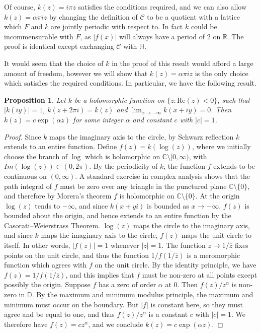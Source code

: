 \documentclass[a4paper, oneside, 12pt]{amsart}
\newtheorem{proposition}{Proposition}
\renewcommand{\Re}{\text{Re}}
\newcommand{\mc}{\mathcal}
\newcommand{\C}{\mathbb{C}}
\newcommand{\D}{\mathbb{D}}
\renewcommand{\H}{\mathbb{H}}
\newcommand{\R}{\mathbb{R}}
\begin{document}
Of course, $k(z) = i\pi z$ satisfies the conditions required, and we can also allow $k(z) = \alpha \pi i z$ by changing the definition
of $\mc{C}$ to be a quotient with a lattice which $F$ and $k$ are jointly periodic with respect to. In fact $k$ could be incommensurable
with $F$, as $|f(x)|$ will always have a period of $2$ on $\R$. The proof is identical except exchanging $\mc{C}$ with $\H$. 

It would seem that the choice of $k$ in the proof of this result would afford a
large amount of freedom, however we will show that $k(z) = \alpha \pi i z$ is
the only choice which satisfies the required conditions. In particular, we have
the following result.
\begin{proposition}
	Let $k$ be a holomorphic function on $\{z:\Re(z)<0\}$, such that $|k(iy)|=1$, $k(z+2\pi i) = k(z)$ and $\lim_{x\to-\infty} k(x+iy) = 0$. Then $k(z) =c\exp(\alpha z)$ for some integer $\alpha$ and constant $c$ with $|c|=1$. 

\end{proposition}
\begin{proof}
      Since $k$ maps the imaginary axis to
    the circle, by Schwarz reflection $k$ extends to an entire function. Define
    $f(z) =  k(\log(z))$, where we initially choose the branch of $\log$ which is holomorphic on
    $\C\setminus[0,\infty)$, with $Im(\log(z)) \in (0, 2 \pi)$. By the periodicity of $k$, the function $f$ extends to be
    continuous on $(0, \infty)$. A standard exercise in complex analysis shows
    that the path integral of $f$ must be zero over any triangle in the
    punctured plane $\C\setminus\{0\}$, and therefore by Morera's theorem $f$
    is holomorphic on $\C\setminus\{0\}$. At the origin $\log(z)$ tends to
    $-\infty$, and since $k(x+yi)$ is bounded as $x\to-\infty$, $f(z)$ is
    bounded about the origin, and hence extends to an entire function by the Casorati–Weierstrass Theorem.
    $\log(z)$ maps the circle to the imaginary axis, and since $k$ maps
    the imaginary axis to the circle, $f(z)$ maps the unit circle to itself. In
    other words, $|f(z)| = 1$ whenever $|z|=1$. The function $z \to
    1/\overline{z}$ fixes points on the unit circle, and thus the function
    $1/\overline{f(1/\overline{z})}$ is a meromorphic function which agrees
    with $f$ on the unit circle. By the identity principle, we have $f(z) =
    1/\overline{f(1/\overline{z})}$, and this implies that $f$ must be non-zero
    at all points except possibly the origin. Suppose $f$ has a zero of order
    $\alpha$ at $0$. Then $f(z)/z^\alpha$ is non-zero in $\D$. By the maximum
    and minimum
    modulus principle, the maximum and minimum must occur on the boundary. But
    $|f|$ is constant here, so they must agree and be equal to one, and thus $f(z)/z^\alpha$ is a constant $c$ with $|c|=1$. We therefore have $f(z) =
    cz^\alpha$, and we conclude $k(z) = c\exp(\alpha z)$.
\end{proof}
\end{document}
